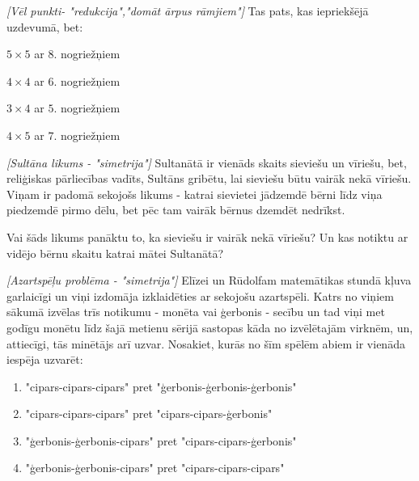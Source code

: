 \begin{problem}
\textit{[Vēl punkti- "redukcija","domāt ārpus rāmjiem"]}
Tas pats, kas iepriekšējā uzdevumā, bet:
\begin{enumerate}
\begin{multicols}{2}
\item $5 \times 5$ ar $8$. nogriežņiem 
\item $4 \times 4$ ar $6$. nogriežņiem
\item $3 \times 4$ ar $5$. nogriežņiem
\item $4 \times 5$ ar $7$. nogriežņiem
\end{multicols}
\end{enumerate}
\end{problem}
%

\begin{problem}
\textit{[Sultāna likums - "simetrija"]}
Sultanātā ir vienāds skaits sieviešu un vīriešu, bet, reliģiskas pārliecības vadīts, Sultāns gribētu, lai sieviešu būtu vairāk nekā vīriešu.
Viņam ir padomā sekojošs likums - katrai sievietei jādzemdē bērni līdz viņa piedzemdē pirmo dēlu, bet pēc tam vairāk bērnus dzemdēt nedrīkst.

Vai šāds likums panāktu to, ka sieviešu ir vairāk nekā vīriešu? Un kas notiktu ar vidējo bērnu skaitu katrai mātei Sultanātā?
\end{problem}
%


\begin{problem}
\textit{[Azartspēļu problēma - "simetrija"]}
Elīzei un Rūdolfam matemātikas stundā kļuva garlaicīgi un viņi izdomāja izklaidēties ar sekojošu azartspēli. Katrs no viņiem sākumā izvēlas trīs notikumu - monēta vai ģerbonis - secību un tad viņi met godīgu monētu līdz šajā metienu sērijā sastopas kāda no izvēlētajām virknēm, un, attiecīgi, tās minētājs arī uzvar. Nosakiet, kurās no šīm spēlēm abiem ir vienāda iespēja uzvarēt:
\begin{enumerate}

\item "cipars-cipars-cipars" pret "ģerbonis-ģerbonis-ģerbonis"
\item "cipars-cipars-cipars" pret "cipars-cipars-ģerbonis"
\item "ģerbonis-ģerbonis-cipars" pret "cipars-cipars-ģerbonis"
\item "ģerbonis-ģerbonis-cipars" pret "cipars-cipars-cipars"

\end{enumerate}

\end{problem}
%

